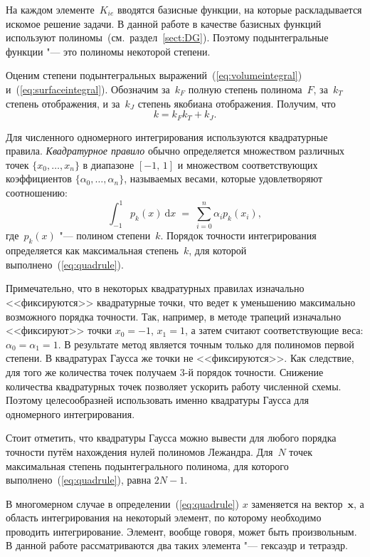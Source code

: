 На каждом элементе~\( K_{ie}\) вводятся базисные функции, на которые раскладывается искомое решение задачи. В данной работе в качестве базисных функций используют полиномы~(см.~раздел~\ref{sect:DG}). Поэтому подынтегральные функции "--- это полиномы некоторой степени.

Оценим степени подынтегральных выражений~(\ref{eq:volumeintegral}) и~(\ref{eq:surfaceintegral}). Обозначим за~\(k_F\) полную степень полинома~\(F\), за~\(k_T\) степень отображения, и за~\(k_J\) степень якобиана отображения. Получим, что
\begin{equation}\label{eq:intdegree}
k = k_F k_T + k_J.
\end{equation}

Для численного одномерного интегрирования используются квадратурные правила. \textit{Квадратурное правило} обычно определяется множеством различных точек \(\bigl\{x_0,\ldots, x_n \bigr\}\) в диапазоне \([-1,\, 1]\) и множеством соответствующих коэффициентов \(\bigl\{\alpha_0,\ldots, \alpha_n \bigr\}\), называемых весами, которые удовлетворяют соотношению:
\begin{equation}\label{eq:quadrule}
\int_{-1}^{1} p_k(x)\: \mathrm dx \; = \; \sum_{i = 0}^{n} \alpha_i p_k(x_i),
\end{equation}
где~\(p_k(x)\) "--- полином степени~\(k\). Порядок точности интегрирования определяется как максимальная степень~\(k\), для которой  выполнено~(\ref{eq:quadrule}).

Примечательно, что в некоторых квадратурных правилах изначально <<фиксируются>> квадратурные точки, что ведет к уменьшению максимально возможного порядка точности. Так, например, в методе трапеций изначально <<фиксируют>> точки \(x_0 = -1\), \(x_1 = 1\), а затем считают соответствующие веса: \(\alpha_0 = \alpha_1 = 1\). В результате метод является точным только для полиномов первой степени. В квадратурах Гаусса же точки не <<фиксируются>>. Как следствие, для того же количества точек получаем 3-й порядок точности. Снижение количества квадратурных точек позволяет ускорить работу численной схемы. Поэтому целесообразней использовать именно квадратуры Гаусса для одномерного интегрирования.

Стоит отметить, что квадратуры Гаусса можно вывести для любого порядка точности путём нахождения нулей полиномов Лежандра. Для~\(N\) точек максимальная степень подынтегрального полинома, для которого выполнено~(\ref{eq:quadrule}), равна \(2N - 1\).

В многомерном случае в определении~(\ref{eq:quadrule}) \(x\) заменяется на вектор~\(\mathbf x\), а область интегрирования на некоторый элемент, по которому необходимо проводить интегрирование. Элемент, вообще говоря, может быть произвольным. В данной работе рассматриваются два таких элемента "--- гексаэдр и тетраэдр.

